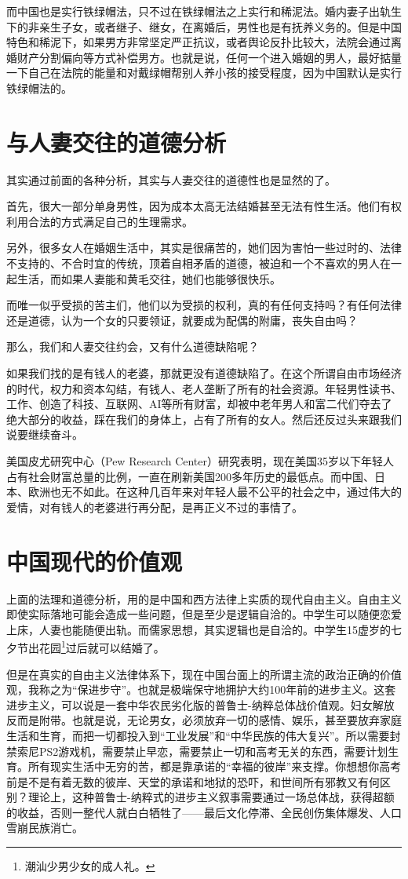 而中国也是实行铁绿帽法，只不过在铁绿帽法之上实行和稀泥法。婚内妻子出轨生下的非亲生子女，或者继子、继女，在离婚后，男性也是有抚养义务的。但是中国特色和稀泥下，如果男方非常坚定严正抗议，或者舆论反扑比较大，法院会通过离婚财产分割偏向等方式补偿男方。也就是说，任何一个进入婚姻的男人，最好掂量一下自己在法院的能量和对戴绿帽帮别人养小孩的接受程度，因为中国默认是实行铁绿帽法的。

\section{与人妻交往的道德分析}

其实通过前面的各种分析，其实与人妻交往的道德性也是显然的了。

首先，很大一部分单身男性，因为成本太高无法结婚甚至无法有性生活。他们有权利用合法的方式满足自己的生理需求。

另外，很多女人在婚姻生活中，其实是很痛苦的，她们因为害怕一些过时的、法律不支持的、不合时宜的传统，顶着自相矛盾的道德，被迫和一个不喜欢的男人在一起生活，而如果人妻能和黄毛交往，她们也能够很快乐。

而唯一似乎受损的苦主们，他们以为受损的权利，真的有任何支持吗？有任何法律还是道德，认为一个女的只要领证，就要成为配偶的附庸，丧失自由吗？

那么，我们和人妻交往约会，又有什么道德缺陷呢？

如果我们找的是有钱人的老婆，那就更没有道德缺陷了。在这个所谓自由市场经济的时代，权力和资本勾结，有钱人、老人垄断了所有的社会资源。年轻男性读书、工作、创造了科技、互联网、AI等所有财富，却被中老年男人和富二代们夺去了绝大部分的收益，踩在我们的身体上，占有了所有的女人。然后还反过头来跟我们说要继续奋斗。

美国皮尤研究中心（Pew Research Center）研究表明，现在美国35岁以下年轻人占有社会财富总量的比例，一直在刷新美国200多年历史的最低点。而中国、日本、欧洲也无不如此。在这种几百年来对年轻人最不公平的社会之中，通过伟大的爱情，对有钱人的老婆进行再分配，是再正义不过的事情了。

\section{中国现代的价值观}

上面的法理和道德分析，用的是中国和西方法律上实质的现代自由主义。自由主义即使实际落地可能会造成一些问题，但是至少是逻辑自洽的。中学生可以随便恋爱上床，人妻也能随便出轨。而儒家思想，其实逻辑也是自洽的。中学生15虚岁的七夕节出花园\footnote{潮汕少男少女的成人礼。}过后就可以结婚了。

但是在真实的自由主义法律体系下，现在中国台面上的所谓主流的政治正确的价值观，我称之为``保进步守''。也就是极端保守地拥护大约100年前的进步主义。这套进步主义，可以说是一套中华农民劣化版的普鲁士-纳粹总体战价值观。妇女解放反而是附带。也就是说，无论男女，必须放弃一切的感情、娱乐，甚至要放弃家庭生活和生育，而把一切都投入到``工业发展''和``中华民族的伟大复兴''。所以需要封禁索尼PS2游戏机，需要禁止早恋，需要禁止一切和高考无关的东西，需要计划生育。所有现实生活中无穷的苦，都是靠承诺的``幸福的彼岸''来支撑。你想想你高考前是不是有着无数的彼岸、天堂的承诺和地狱的恐吓，和世间所有邪教又有何区别？理论上，这种普鲁士-纳粹式的进步主义叙事需要通过一场总体战，获得超额的收益，否则一整代人就白白牺牲了——最后文化停滞、全民创伤集体爆发、人口雪崩民族消亡。

